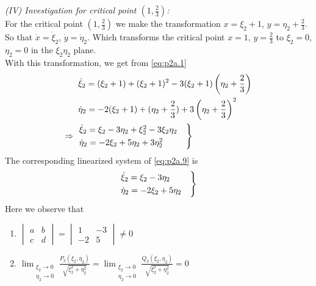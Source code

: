 \documentclass[../main-sheet.tex]{subfiles}
\begin{document}
\begin{soln}[a]
    \emph{(IV) Investigation for critical point \((1,\frac{2}{3})\):}\\
    For the critical point \((1,\frac{2}{3})\) we make the transformation \(x=\xi_2+1\), \(y=\eta_2+\frac{2}{3}\). So that \(\dot{x}=\dot{\xi}_2\), \(\dot{y}=\dot{\eta}_2\). Which transforms the critical point \(x=1\), \(y=\frac{2}{3}\) to \(\xi_2=0\), \(\eta_2=0\) in the \(\xi_2\eta_2\) plane.\\
    With this transformation, we get from \eqref{eq:p2a.1}
    \begin{align}
        &\dot{\xi}_2=(\xi_2+1)+(\xi_2+1)^2-3(\xi_2+1)\left(\eta_2+\frac{2}{3}\right)\notag\\
        &\dot{\eta}_2=-2(\xi_2+1)+(\eta_2+\frac{2}{3})+3\left(\eta_2+\frac{2}{3}\right)^2\notag\\
        \Rightarrow\;\;&\begin{aligned}
            \begin{rcases}
                \dot{\xi}_2=\xi_2-3\eta_2+\xi_2^2-3\xi_2\eta_2\quad\\
                \dot{\eta}_2=-2\xi_2+5\eta_2+3\eta_2^2
            \end{rcases}
        \end{aligned}\label{eq:p2a.9}
    \end{align}
    The corresponding linearized system of \eqref{eq:p2a.9} is 
    \begin{equation}
        \begin{rcases}
            \dot{\xi}_2=\xi_2-3\eta_2\\
            \dot{\eta}_2=-2\xi_2+5\eta_2\quad
        \end{rcases}
        \label{eq:p2a.10}
    \end{equation}
    Here we observe that
    \begin{enumerate}[label=(\roman*)]
        \item \(\begin{vmatrix}
            a&b\\
            c&d
        \end{vmatrix}=\begin{vmatrix}
            1&-3\\
            -2&5
        \end{vmatrix}\neq 0\)
        \item \(\displaystyle\lim_{\substack{\xi_2\to 0 \\ \eta_2\to 0}} \frac{P_3(\xi_2,\eta_2)}{\sqrt{\xi_2^2+\eta_2^2}}=\lim_{\substack{\xi_2\to 0 \\ \eta_2\to 0}} \frac{Q_3(\xi_2,\eta_2)}{\sqrt{\xi_2^2+\eta_2^2}}=0\)\\ 
        

\end{enumerate}
\end{soln}
\end{document}

